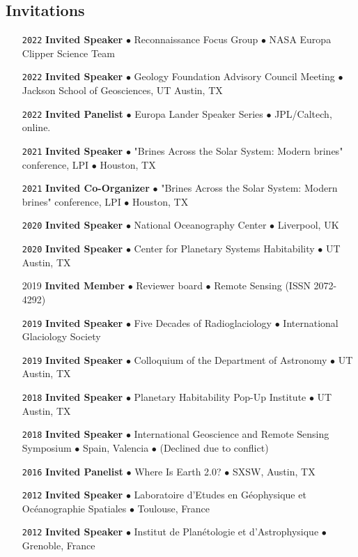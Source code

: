 \vspace{-1.5em}
\subsection*{Invitations}

\begin{itemize}[leftmargin=3.8em, labelsep=1.5em]
    \setlength\itemsep{-.5em}
    \item[\texttt{2022}] \textbf{Invited Speaker} $\bullet$ Reconnaissance Focus Group $\bullet$ NASA Europa Clipper Science Team
    \item[\texttt{2022}] \textbf{Invited Speaker} $\bullet$ Geology Foundation Advisory Council Meeting $\bullet$ Jackson School of Geosciences, UT Austin, TX
    \item[\texttt{2022}] \textbf{Invited Panelist} $\bullet$ Europa Lander Speaker Series $\bullet$ JPL/Caltech, online.
    \item[\texttt{2021}] \textbf{Invited Speaker} $\bullet$ "Brines Across the Solar System: Modern brines" conference, LPI $\bullet$ Houston, TX
    \item[\texttt{2021}] \textbf{Invited Co-Organizer} $\bullet$ "Brines Across the Solar System: Modern brines" conference, LPI $\bullet$ Houston, TX
    \item[\texttt{2020}] \textbf{Invited Speaker} $\bullet$ National Oceanography Center $\bullet$ Liverpool, UK
    \item[\texttt{2020}] \textbf{Invited Speaker} $\bullet$ Center for Planetary Systems Habitability $\bullet$ UT Austin, TX
    \item[2019] \textbf{Invited Member} $\bullet$ Reviewer board $\bullet$ Remote Sensing (ISSN 2072-4292)
    \item[\texttt{2019}] \textbf{Invited Speaker} $\bullet$ Five Decades of Radioglaciology $\bullet$ International Glaciology Society
    \item[\texttt{2019}] \textbf{Invited Speaker} $\bullet$ Colloquium of the Department of Astronomy $\bullet$ UT Austin, TX
    \item[\texttt{2018}] \textbf{Invited Speaker} $\bullet$ Planetary Habitability Pop-Up Institute $\bullet$ UT Austin, TX
    \item[\texttt{2018}] \textbf{Invited Speaker} $\bullet$ International Geoscience and Remote Sensing Symposium $\bullet$ Spain, Valencia $\bullet$ (Declined due to conflict)
    \item[\texttt{2016}] \textbf{Invited Panelist} $\bullet$ Where Is Earth 2.0? $\bullet$ SXSW, Austin, TX
    \item[\texttt{2012}] \textbf{Invited Speaker} $\bullet$ Laboratoire d'Etudes en Géophysique et Océanographie Spatiales $\bullet$ Toulouse, France
    \item[\texttt{2012}] \textbf{Invited Speaker} $\bullet$ Institut de Planétologie et d'Astrophysique $\bullet$ Grenoble, France
\end{itemize}